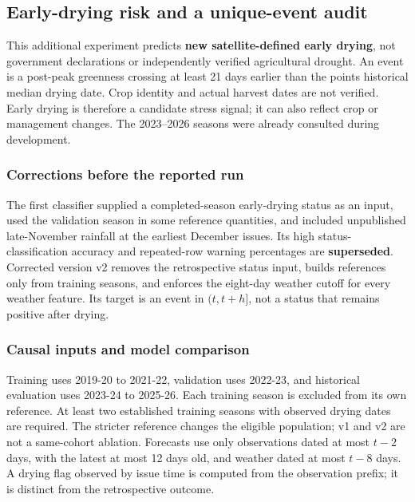 \subsection{Early-drying risk and a unique-event audit}

\label{sec:rabi_events}

This additional experiment predicts \textbf{new satellite-defined early drying}, not government declarations or independently verified agricultural drought. An event is a post-peak greenness crossing at least 21 days earlier than the point\textquotesingle s historical median drying date. Crop identity and actual harvest dates are not verified. Early drying is therefore a candidate stress signal; it can also reflect crop or management changes. The 2023--2026 seasons were already consulted during development.

\subsubsection{Corrections before the reported run}

The first classifier supplied a completed-season early-drying status as an input, used the validation season in some reference quantities, and included unpublished late-November rainfall at the earliest December issues. Its high status-classification accuracy and repeated-row warning percentages are \textbf{superseded}. Corrected version v2 removes the retrospective status input, builds references only from training seasons, and enforces the eight-day weather cutoff for every weather feature. Its target is an event in $(t,t+h]$, not a status that remains positive after drying.

\subsubsection{Causal inputs and model comparison}

Training uses 2019-20 to 2021-22, validation uses 2022-23, and historical evaluation uses 2023-24 to 2025-26. Each training season is excluded from its own reference. At least two established training seasons with observed drying dates are required. The stricter reference changes the eligible population; v1 and v2 are not a same-cohort ablation. Forecasts use only observations dated at most $t-2$ days, with the latest at most 12 days old, and weather dated at most $t-8$ days. A drying flag observed by issue time is computed from the observation prefix; it is distinct from the retrospective outcome.

